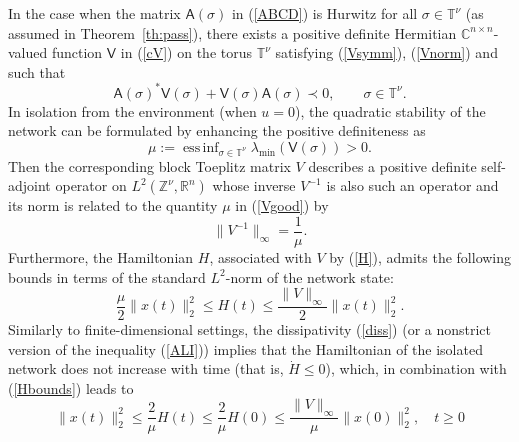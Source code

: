 \documentclass[letterpaper, 10pt, conference]{ieeeconf}  %
\def\<{\leqslant}           %
\def\>{\geqslant}           %
\def\mZ{\mathbb{Z}}    %
\def\mR{\mathbb{R}}    %
\def\mC{\mathbb{C}}    %
\def\x{\times}
\def\sA{\mathsf{A}}
\def\sV{\mathsf{V}}
\def\mT{\mathbb{T}}
\def\mZ{\mathbb{Z}}
\def\essinf{\mathop{\mathrm{ess\, inf}}}    %
\begin{document}
%
In the case when the matrix $\sA(\sigma)$ in (\ref{ABCD}) is Hurwitz for all $\sigma \in \mT^\nu$ (as assumed in Theorem~\ref{th:pass}), there exists a positive definite Hermitian $\mC^{n\x n}$-valued function $\sV$ in (\ref{cV}) on the torus $\mT^\nu$ satisfying (\ref{Vsymm}), (\ref{Vnorm}) and such that
\begin{equation}
\label{ALI}
    \sA(\sigma)^* \sV(\sigma) +\sV(\sigma) \sA(\sigma) \prec 0,
    \qquad
    \sigma \in \mT^\nu.
\end{equation}
In isolation from the environment (when $u=0$), the quadratic stability of the network can be formulated by enhancing the positive definiteness as
\begin{equation}
\label{Vgood}
    \mu
    :=
    \essinf_{\sigma \in \mT^\nu}
    \lambda_{\min}(\sV(\sigma))
    >0.
\end{equation}
Then
the corresponding block Toeplitz matrix $V$ describes a positive definite self-adjoint operator on $L^2(\mZ^\nu, \mR^n)$ whose inverse $V^{-1}$ is also     such an operator and its norm is related to the quantity $\mu$ in (\ref{Vgood}) by
\begin{equation}
\label{Vinvnorm}
    \|V^{-1}\|_{\infty}
    =
    \frac{1}{\mu}.
\end{equation}
Furthermore, the Hamiltonian $H$, associated with $V$ by (\ref{H}), admits the following bounds  in terms of the standard $L^2$-norm of the network state:
\begin{equation}
\label{Hbounds}
    \frac{\mu}{2}
    \|x(t)\|_2^2
    \<
    H(t)
    \<
    \frac{\|V\|_{\infty}}{2}
    \|x(t)\|_2^2.
\end{equation}
Similarly to finite-dimensional settings,
the dissipativity (\ref{diss}) (or a nonstrict version of the inequality  (\ref{ALI})) implies that the Hamiltonian of the isolated network does not increase with time (that is, $\dot{H}\< 0$), which, in combination with (\ref{Hbounds}) leads to
\begin{equation}
\label{cond}
    \|x(t)\|_2^2
    \<
    \frac{2}{\mu} H(t)
    \<
    \frac{2}{\mu} H(0)
      \< \frac{\|V\|_\infty}{\mu} \|x(0)\|_2^2,
    \quad
    t\>0
\end{equation}
\end{document}
